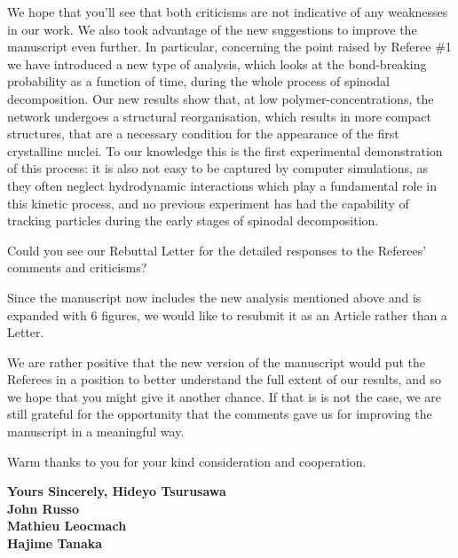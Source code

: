\documentclass[11pt,a4paper]{article}
\begin{document}
We hope that you'll see that both criticisms are not indicative of any weaknesses in our work. We also took advantage of the new suggestions to improve the manuscript even further. In particular, concerning the point raised by Referee \#1 we have introduced a new type of analysis, which looks at the bond-breaking probability as a function of time, during the whole process of spinodal decomposition. Our new results show that, at low polymer-concentrations, the network undergoes a structural reorganisation, which results in more compact structures, that are a necessary condition for the appearance of the first crystalline nuclei. To our knowledge this is the first experimental demonstration of this process: it is also not easy to be captured by computer simulations, as they often neglect hydrodynamic interactions which play a fundamental role in this kinetic process, and no previous experiment has had the capability of tracking particles during the early stages of spinodal decomposition.

\vskip 0.3cm

Could you see our Rebuttal Letter for the detailed responses to the Referees' comments and criticisms?

\vskip 0.3cm

Since the manuscript now includes the new analysis mentioned above and is expanded with 6 figures, we would like to resubmit it as an Article rather than a Letter. 
\textit{
\vskip 0.3cm}

We are rather positive that the new version of the manuscript would put the Referees in a position to better understand the full extent of our results, and
so we hope that you might give it another chance. If that is is not the case, we are still grateful for the opportunity that the comments gave us for improving the manuscript in a meaningful way.

\vskip 0.5cm

Warm thanks to you for your kind consideration and cooperation. 

\vskip 0.8cm

\noindent
{\bf Yours Sincerely,
\vskip 0.3cm
\indent Hideyo Tsurusawa\\
\indent John Russo\\
\indent Mathieu Leocmach\\
\indent Hajime Tanaka}
\end{document}
